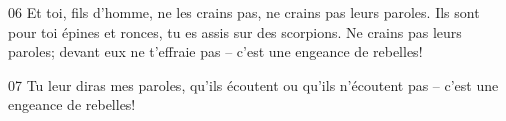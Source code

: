 
06 Et toi, fils d’homme, ne les crains pas, ne crains pas leurs paroles. Ils sont pour toi épines et ronces, tu es assis sur des scorpions. Ne crains pas leurs paroles; devant eux ne t’effraie pas – c’est une engeance de rebelles!

07 Tu leur diras mes paroles, qu’ils écoutent ou qu’ils n’écoutent pas – c’est une engeance de rebelles!
